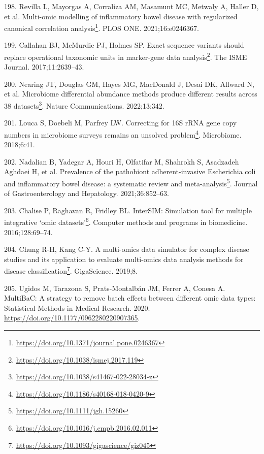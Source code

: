 \documentclass[
  12pt,
  a4paper,
  twoside,
  openright]{book}
\DeclareRobustCommand{\href}[2]{#2\footnote{\url{#1}}}
\newlength{\cslhangindent}
\newlength{\cslentryspacingunit} %
\newenvironment{CSLReferences}[2] %
 {%
  \setlength{\parindent}{0pt}
  \ifodd #1
  \let\oldpar\par
  \def\par{\hangindent=\cslhangindent\oldpar}
  \fi
  \setlength{\parskip}{#2\cslentryspacingunit}
 }%
 {}
\begin{document}
\begin{CSLReferences}{0}{0}
\leavevmode{}%
198. Revilla L, Mayorgas A, Corraliza AM, Masamunt MC, Metwaly A, Haller D, et al. \href{https://doi.org/10.1371/journal.pone.0246367}{Multi-omic modelling of inflammatory bowel disease with regularized canonical correlation analysis}. PLOS ONE. 2021;16:e0246367.

\leavevmode{}%
199. Callahan BJ, McMurdie PJ, Holmes SP. \href{https://doi.org/10.1038/ismej.2017.119}{Exact sequence variants should replace operational taxonomic units in marker-gene data analysis}. The ISME Journal. 2017;11:2639--43.

\leavevmode{}%
200. Nearing JT, Douglas GM, Hayes MG, MacDonald J, Desai DK, Allward N, et al. \href{https://doi.org/10.1038/s41467-022-28034-z}{Microbiome differential abundance methods produce different results across 38 datasets}. Nature Communications. 2022;13:342.

\leavevmode{}%
201. Louca S, Doebeli M, Parfrey LW. \href{https://doi.org/10.1186/s40168-018-0420-9}{Correcting for 16S rRNA gene copy numbers in microbiome surveys remains an unsolved problem}. Microbiome. 2018;6:41.

\leavevmode{}%
202. Nadalian B, Yadegar A, Houri H, Olfatifar M, Shahrokh S, Asadzadeh Aghdaei H, et al. \href{https://doi.org/10.1111/jgh.15260}{Prevalence of the pathobiont adherent-invasive Escherichia coli and inflammatory bowel disease: a systematic review and meta-analysis}. Journal of Gastroenterology and Hepatology. 2021;36:852--63.

\leavevmode{}%
203. Chalise P, Raghavan R, Fridley BL. \href{https://doi.org/10.1016/j.cmpb.2016.02.011}{InterSIM: Simulation tool for multiple integrative {`}omic datasets{'}}. Computer methods and programs in biomedicine. 2016;128:69--74.

\leavevmode{}%
204. Chung R-H, Kang C-Y. \href{https://doi.org/10.1093/gigascience/giz045}{A multi-omics data simulator for complex disease studies and its application to evaluate multi-omics data analysis methods for disease classification}. GigaScience. 2019;8.

\leavevmode{}%
205. Ugidos M, Tarazona S, Prats-Montalbán JM, Ferrer A, Conesa A. MultiBaC: A strategy to remove batch effects between different omic data types: Statistical Methods in Medical Research. 2020. \url{https://doi.org/10.1177/0962280220907365}.


\end{CSLReferences}
\end{document}
